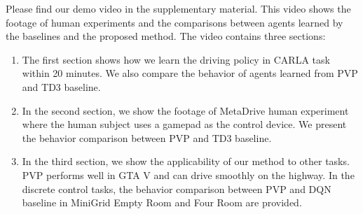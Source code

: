 
Please find our demo video in the supplementary material. This video shows the footage of human experiments and the comparisons between agents learned by the baselines and the proposed method. 
The video contains three sections:
\begin{enumerate}
\item The first section shows how we learn the driving policy in CARLA task within 20 minutes. We also compare the behavior of agents learned from PVP and TD3 baseline. 
\item In the second section, we show the footage of MetaDrive human experiment where the human subject uses a gamepad as the control device. We present the behavior comparison between PVP and TD3 baseline. 
\item In the third section, we show the applicability of our method to other tasks. PVP performs well in GTA V and can drive smoothly on the highway. In the discrete control tasks, the behavior comparison between PVP and DQN baseline in MiniGrid Empty Room and Four Room are provided.
\end{enumerate}






